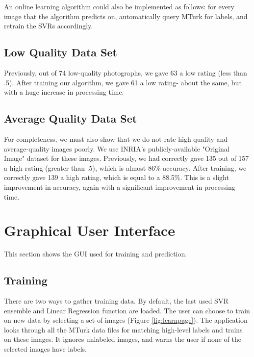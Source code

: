 \documentclass[11pt,letter]{article}
\begin{document}
An online learning algorithm could also be implemented as follows: for every image that the algorithm predicts on, automatically query MTurk for labels, and retrain the SVRs accordingly.

\subsection{Low Quality Data Set}
Previously, out of 74 low-quality photographs, we gave 63 a low rating (less than .5). After training our algorithm, we gave 61 a low rating- about the same, but with a huge increase in processing time.

\subsection{Average Quality Data Set}
For completeness, we must also show that we do not rate high-quality and average-quality images poorly. We use INRIA's publicly-available "Original Image" dataset\cite{JDS08} for these images. Previously, we had correctly gave 135 out of 157 a high rating (greater than .5), 
which is almost 86\% accuracy. After training, we correctly gave 139 a high rating,
which is equal to a 88.5\%.
This is a slight improvement in accuracy, again with a significant improvement in processing time.

\appendix
\section{Graphical User Interface}
This section shows the GUI used for training and prediction.

\subsection{Training}
There are two ways to gather training data. By default, the last used SVR ensemble and Linear Regression function are loaded. The user can choose to train on new data by selecting a set of images (Figure \ref{fig:learnpage}). The application looks through all the MTurk data files for matching high-level labels and trains on these images. It ignores unlabeled images, and warns the user if none of the selected images have labels.

\begin{figure*}[h!]
  \centering
  \caption{When learning, the user has two options. The first option is to choose a new set of images to train on. The second is to select saved training data.}
  \label{fig:learnpage}
\end{figure*}
\end{document}
